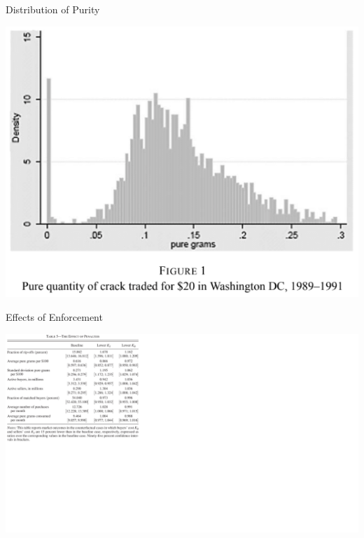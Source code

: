\documentclass[10pt,ignorenonframetext,]{beamer}
\begin{document}
\begin{frame}{Distribution of Purity}
\protect\hypertarget{distribution-of-purity}{}

\includegraphics{Figure1.png}

\end{frame}

\begin{frame}{Effects of Enforcement}
\protect\hypertarget{effects-of-enforcement}{}

\includegraphics[width=3\textwidth,height=\textheight]{Figure3.png}

\end{frame}
\end{document}
